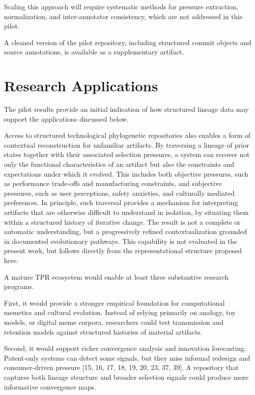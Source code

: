 \documentclass[11pt]{article}
\begin{document}
Scaling this approach will require systematic methods for pressure extraction, normalization, and inter-annotator consistency, which are not addressed in this pilot.

A cleaned version of the pilot repository, including structured commit objects and source annotations, is available as a supplementary artifact.

\section{Research Applications}
The pilot results provide an initial indication of how structured lineage data may support the applications discussed below.

Access to structured technological phylogenetic repositories also enables a form of contextual reconstruction for unfamiliar artifacts. By traversing a lineage of prior states together with their associated selection pressures, a system can recover not only the functional characteristics of an artifact but also the constraints and expectations under which it evolved. This includes both objective pressures, such as performance trade-offs and manufacturing constraints, and subjective pressures, such as user perceptions, safety anxieties, and culturally mediated preferences. In principle, such traversal provides a mechanism for interpreting artifacts that are otherwise difficult to understand in isolation, by situating them within a structured history of iterative change. The result is not a complete or automatic understanding, but a progressively refined contextualization grounded in documented evolutionary pathways. This capability is not evaluated in the present work, but follows directly from the representational structure proposed here.

A mature TPR ecosystem would enable at least three substantive research programs.

First, it would provide a stronger empirical foundation for computational memetics and cultural evolution. Instead of relying primarily on analogy, toy models, or digital meme corpora, researchers could test transmission and retention models against structured histories of material artifacts.

Second, it would support richer convergence analysis and innovation forecasting. Patent-only systems can detect some signals, but they miss informal redesign and consumer-driven pressure [15, 16, 17, 18, 19, 20, 23, 37, 39]. A repository that captures both lineage structure and broader selection signals could produce more informative convergence maps.
\end{document}
